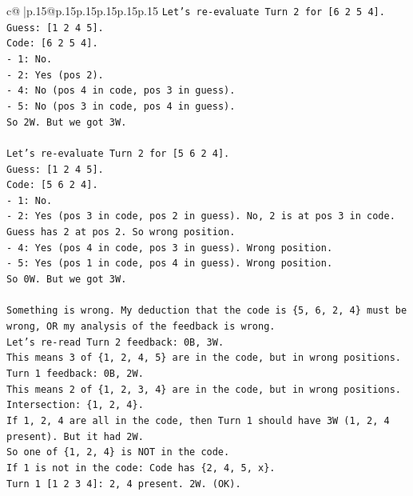 \documentclass{article}
\begin{document}
{\begin{supertabular}{c@{$\;$}|p{.15\linewidth}@{}p{.15\linewidth}p{.15\linewidth}p{.15\linewidth}p{.15\linewidth}p{.15\linewidth}}
{{{\texttt{Let's re{-}evaluate Turn 2 for {[}6 2 5 4{]}.} \\
\texttt{Guess: {[}1 2 4 5{]}.} \\
\texttt{Code: {[}6 2 5 4{]}.} \\
\texttt{{-} 1: No.} \\
\texttt{{-} 2: Yes (pos 2).} \\
\texttt{{-} 4: No (pos 4 in code, pos 3 in guess).} \\
\texttt{{-} 5: No (pos 3 in code, pos 4 in guess).} \\
\texttt{So 2W. But we got 3W.} \\
\\ 
\texttt{Let's re{-}evaluate Turn 2 for {[}5 6 2 4{]}.} \\
\texttt{Guess: {[}1 2 4 5{]}.} \\
\texttt{Code: {[}5 6 2 4{]}.} \\
\texttt{{-} 1: No.} \\
\texttt{{-} 2: Yes (pos 3 in code, pos 2 in guess). No, 2 is at pos 3 in code. Guess has 2 at pos 2. So wrong position.} \\
\texttt{{-} 4: Yes (pos 4 in code, pos 3 in guess). Wrong position.} \\
\texttt{{-} 5: Yes (pos 1 in code, pos 4 in guess). Wrong position.} \\
\texttt{So 0W. But we got 3W.} \\
\\ 
\texttt{Something is wrong. My deduction that the code is \{5, 6, 2, 4\} must be wrong, OR my analysis of the feedback is wrong.} \\
\texttt{Let's re{-}read Turn 2 feedback: 0B, 3W.} \\
\texttt{This means 3 of \{1, 2, 4, 5\} are in the code, but in wrong positions.} \\
\texttt{Turn 1 feedback: 0B, 2W.} \\
\texttt{This means 2 of \{1, 2, 3, 4\} are in the code, but in wrong positions.} \\
\texttt{Intersection: \{1, 2, 4\}.} \\
\texttt{If 1, 2, 4 are all in the code, then Turn 1 should have 3W (1, 2, 4 present). But it had 2W.} \\
\texttt{So one of \{1, 2, 4\} is NOT in the code.} \\
\texttt{If 1 is not in the code: Code has \{2, 4, 5, x\}.} \\
\texttt{Turn 1 {[}1 2 3 4{]}: 2, 4 present. 2W. (OK).} \\
}}}
\end{supertabular}}
\end{document}

